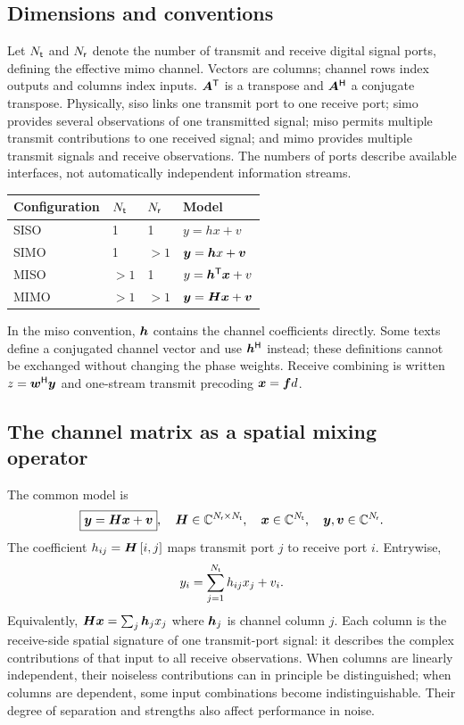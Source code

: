 \subsection{Dimensions and conventions}
Let $N_{\mathsf{t}}$ and $N_{\mathsf{r}}$ denote the number of transmit and receive digital signal ports, defining the effective \ac{mimo} channel. Vectors are columns; channel rows index outputs and columns index inputs. ${\bm{A}}^{\mathsf{T}}$ is a transpose and ${\bm{A}}^{\mathsf{H}}$ a conjugate transpose. Physically, \ac{siso} links one transmit port to one receive port; \ac{simo} provides several observations of one transmitted signal; \ac{miso} permits multiple transmit contributions to one received signal; and \ac{mimo} provides multiple transmit signals and receive observations. The numbers of ports describe available interfaces, not automatically independent information streams.
\begin{center}
\begin{tabular}{llll}\toprule
Configuration & $N_{\mathsf{t}}$ & $N_{\mathsf{r}}$ & Model\\\midrule
SISO & 1 & 1 & $y=hx+v$\\
SIMO & 1 & $>1$ & $\bm{y}=\bm{h}x+\bm{v}$\\
MISO & $>1$ & 1 & $y={\bm{h}}^{\mathsf{T}}\bm{x}+v$\\
MIMO & $>1$ & $>1$ & $\bm{y}=\bm{H}\bm{x}+\bm{v}$\\\bottomrule
\end{tabular}
\end{center}
In the \ac{miso} convention, $\bm{h}$ contains the channel coefficients directly. Some texts define a conjugated channel vector and use ${\bm{h}}^{\mathsf{H}}$ instead; these definitions cannot be exchanged without changing the phase weights. Receive combining is written $z={\bm{w}}^{\mathsf{H}}\bm{y}$ and one-stream transmit precoding $\bm{x}=\bm{f}d$.

\subsection{The channel matrix as a spatial mixing operator}
The common model is
\begin{equation}\label{eq:mimo}
\boxed{\bm{y}=\bm{H}\bm{x}+\bm{v}},\quad
\bm{H}\in\mathbb{C}^{N_{\mathsf{r}}\times N_{\mathsf{t}}},\quad
\bm{x}\in\mathbb{C}^{N_{\mathsf{t}}},\quad\bm{y},\bm{v}\in\mathbb{C}^{N_{\mathsf{r}}}.
\end{equation}
The coefficient $h_{ij}=\bm{H}\left[i,j\right]$ maps transmit port $j$ to receive port $i$. Entrywise,
\begin{equation}
y_i=\sum_{j=1}^{N_{\mathsf{t}}}h_{ij}x_j+v_i.
\end{equation}
Equivalently, $\bm{H}\bm{x}=\sum_j\bm{h}_jx_j$ where $\bm{h}_j$ is channel column $j$. Each column is the receive-side spatial signature of one transmit-port signal: it describes the complex contributions of that input to all receive observations. When columns are linearly independent, their noiseless contributions can in principle be distinguished; when columns are dependent, some input combinations become indistinguishable. Their degree of separation and strengths also affect performance in noise.

